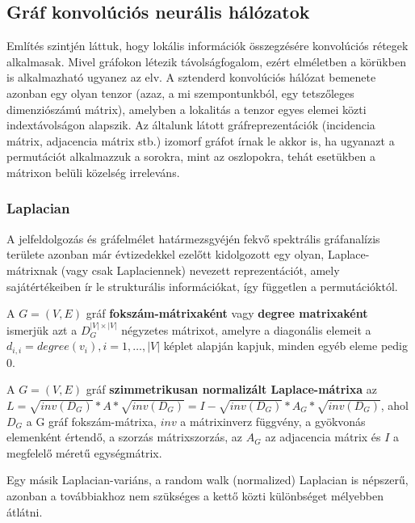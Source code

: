 \subsection{Gráf konvolúciós neurális hálózatok} 
Említés szintjén láttuk, hogy lokális információk összegzésére konvolúciós rétegek alkalmasak. Mivel gráfokon létezik távolságfogalom, ezért elméletben a körükben is alkalmazható ugyanez az elv. A sztenderd konvolúciós hálózat bemenete azonban egy olyan tenzor (azaz, a mi szempontunkból, egy tetszőleges dimenziószámú mátrix), amelyben a lokalitás a tenzor egyes elemei közti indextávolságon alapszik. Az általunk látott gráfreprezentációk (incidencia mátrix, adjacencia mátrix stb.) izomorf gráfot írnak le akkor is, ha ugyanazt a permutációt alkalmazzuk a sorokra, mint az oszlopokra, tehát esetükben a mátrixon belüli közelség irreleváns.

\subsubsection{Laplacian}
A jelfeldolgozás és gráfelmélet határmezsgyéjén fekvő spektrális gráfanalízis területe azonban már évtizedekkel ezelőtt kidolgozott egy olyan, Laplace-mátrixnak (vagy csak Laplaciennek) nevezett reprezentációt\cite{spectral_graph}, amely sajátértékeiben ír le strukturális információkat, így független a permutációktól.

\begin{definition}
A $G=(V,E)$ gráf \textbf{fokszám-mátrixaként} vagy \textbf{degree matrixaként} ismerjük azt a $D_G^{|V| \times |V|}$ négyzetes mátrixot, amelyre a diagonális elemeit a $d_{i,i} = degree(v_i), i=1, \ldots, |V|$ képlet alapján kapjuk, minden egyéb eleme pedig 0.
\end{definition}

\begin{definition}
A $G=(V,E)$ gráf \textbf{szimmetrikusan normalizált Laplace-mátrixa} az $L = \sqrt{inv(D_G)} * A * \sqrt{inv(D_G)} = I - \sqrt{inv(D_G)} * A_G * \sqrt{inv(D_G)}$, ahol $D_G$ a G gráf fokszám-mátrixa, $inv$ a mátrixinverz függvény, a gyökvonás elemenként értendő, a szorzás mátrixszorzás, az $A_G$ az adjacencia mátrix és $I$ a megfelelő méretű egységmátrix.
\end{definition}

\begin{note}
Egy másik Laplacian-variáns, a random walk (normalized) Laplacian is népszerű, azonban a továbbiakhoz nem szükséges a kettő közti különbséget mélyebben átlátni.
\end{note}

